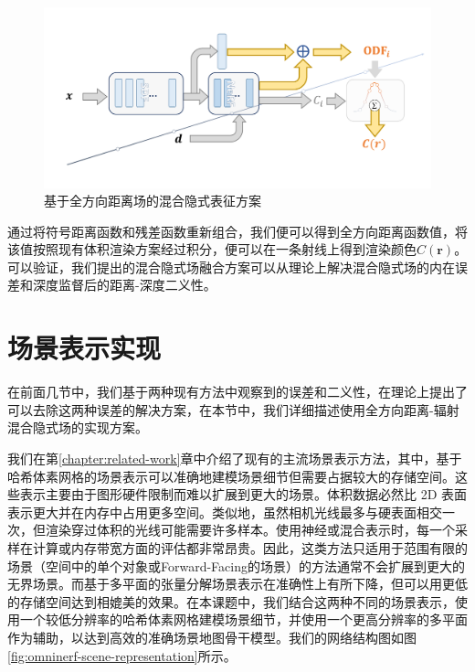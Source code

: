 \begin{figure}[ht]
    \centering
    \includegraphics[width=\textwidth]{undergraduate-thesis/images/omninerf-model.pdf}
    \caption{基于全方向距离场的混合隐式表征方案}
    \label{fig:omninerf-model}
\end{figure}

通过将符号距离函数和残差函数重新组合，我们便可以得到全方向距离函数值，将该值按照现有体积渲染方案经过积分，便可以在一条射线上得到渲染颜色$C(\mathbf{r})$。 可以验证，我们提出的混合隐式场融合方案可以从理论上解决混合隐式场的内在误差和深度监督后的距离-深度二义性。

\section{场景表示实现}
在前面几节中，我们基于两种现有方法中观察到的误差和二义性，在理论上提出了可以去除这两种误差的解决方案，在本节中，我们详细描述使用全方向距离-辐射混合隐式场的实现方案。

我们在第\ref{chapter:related-work}章中介绍了现有的主流场景表示方法，其中，基于哈希体素网格的场景表示可以准确地建模场景细节但需要占据较大的存储空间。这些表示主要由于图形硬件限制而难以扩展到更大的场景。体积数据必然比 2D 表面表示更大并在内存中占用更多空间。类似地，虽然相机光线最多与硬表面相交一次，但渲染穿过体积的光线可能需要许多样本。使用神经或混合表示时，每一个采样在计算或内存带宽方面的评估都非常昂贵。因此，这类方法只适用于范围有限的场景（空间中的单个对象或Forward-Facing的场景）的方法通常不会扩展到更大的无界场景。而基于多平面的张量分解场景表示在准确性上有所下降，但可以用更低的存储空间达到相媲美的效果。在本课题中，我们结合这两种不同的场景表示，使用一个较低分辨率的哈希体素网格建模场景细节，并使用一个更高分辨率的多平面作为辅助，以达到高效的准确场景地图骨干模型。我们的网络结构图如图\ref{fig:omninerf-scene-representation}所示。

